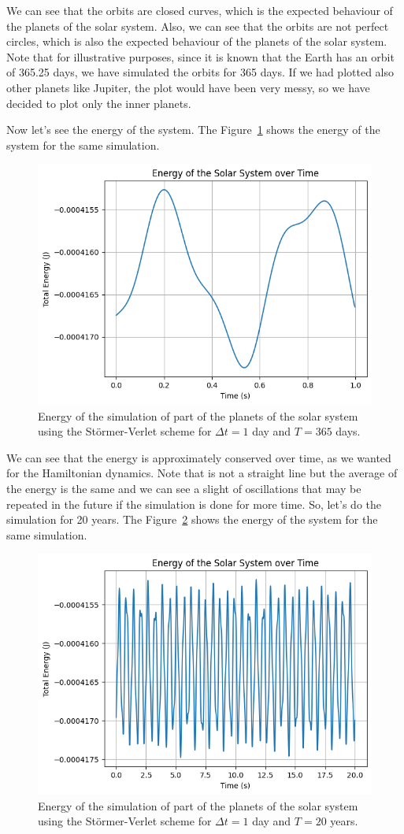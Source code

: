 \documentclass{article}
\begin{document}
We can see that the orbits are closed curves, which is the expected behaviour of the planets of the solar system. Also, we can see that the orbits are not perfect circles, which is also the expected behaviour of the planets of the solar system. Note that for illustrative purposes, since it is known that the Earth has an orbit of 365.25 days, we have simulated the orbits for 365 days. If we had plotted also other planets like Jupiter, the plot would have been very messy, so we have decided to plot only the inner planets.

Now let's see the energy of the system. The Figure~\ref{fig:solarsystemenergy1} shows the energy of the system for the same simulation.

\begin{figure}[H]
	\centering
	\includegraphics[width=0.5\linewidth]{./Figures/SolarSystem/energy1.png}
	\caption{Energy of the simulation of part of the planets of the solar system using the Störmer-Verlet scheme for \(\Delta t = 1\) day and \(T = 365\) days.}
	\label{fig:solarsystemenergy1}
\end{figure}

We can see that the energy is approximately conserved over time, as we wanted for the Hamiltonian dynamics. Note that is not a straight line but the average of the energy is the same and we can see a slight of oscillations that may be repeated in the future if the simulation is done for more time. So, let's do the simulation for 20 years. The Figure~\ref{fig:solarsystemenergy2} shows the energy of the system for the same simulation.

\begin{figure}[H]
	\centering
	\includegraphics[width=0.5\linewidth]{./Figures/SolarSystem/energy2.png}
	\caption{Energy of the simulation of part of the planets of the solar system using the Störmer-Verlet scheme for \(\Delta t = 1\) day and \(T = 20\) years.}
	\label{fig:solarsystemenergy2}
\end{figure}
\end{document}
